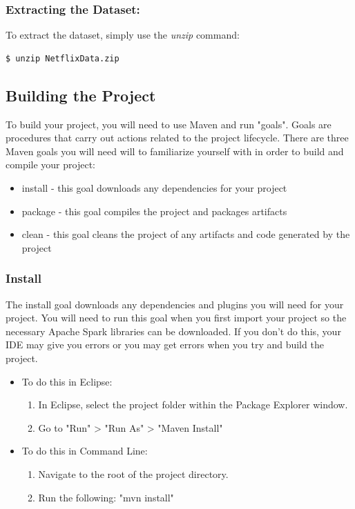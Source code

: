 \documentclass{article}
\begin{document}
\subsubsection*{Extracting the Dataset:}
To extract the dataset, simply use the \textit{unzip} command:
\begin{commandline}\begin{verbatim}$ unzip NetflixData.zip\end{verbatim}\end{commandline}




\subsection{Building the Project}
To build your project, you will need to use Maven and run "goals". Goals are procedures that carry out actions related to the project lifecycle. There are three Maven goals you will need will to familiarize yourself with in order to build and compile your project:
\begin{itemize}
\item install - this goal downloads any dependencies for your project
\item package - this goal compiles the project and packages artifacts
\item clean - this goal cleans the project of any artifacts and code generated by the project
\end{itemize}

\subsubsection*{Install}
The install goal downloads any dependencies and plugins you will need for your project. You will need to run this goal when you first import your project so the necessary Apache Spark libraries can be downloaded. If you don't do this, your IDE may give you errors or you may get errors when you try and build the project. 
\begin{itemize}
\item To do this in Eclipse:
	\begin{enumerate}
	\item In Eclipse, select the project folder within the Package Explorer window.
	\item Go to "Run" > "Run As" > "Maven Install"
	\end{enumerate}
\item To do this in Command Line:
	\begin{enumerate}
	\item Navigate to the root of the project directory.
	\item Run the following: "mvn install"
	\end{enumerate}
\end{itemize}
\end{document}
